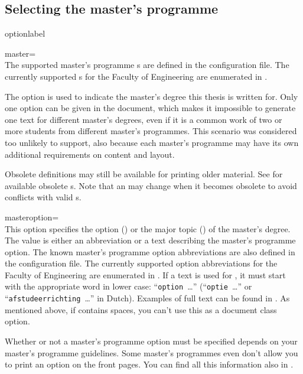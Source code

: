 \subsection{Selecting the master's programme}
\begin{labelled}{optionlabel}
\item[master=\meta{id\,}]\\
  The supported master's programme s are defined in the
  configuration file. The currently supported s for the Faculty of
  Engineering are enumerated in .

  The  option is used to indicate the master's degree this thesis
  is written for. Only one  option can be given in the document,
  which makes it impossible to generate one text for different master's
  degrees, even if it is a common work of two or more students from different
  master's programmes. This scenario was considered too unlikely to support,
  also because each master's programme may have its own additional requirements
  on content and layout.

  Obsolete  definitions may still be available for printing older
  material. See  for available obsolete s.
  Note that an  may change when it becomes obsolete to avoid
  conflicts with valid s.

\item[masteroption=\meta{mo}]\\
  This option specifies the option () or the major topic
  () of the master's degree. The value  is
  either an abbreviation or a text describing the master's programme option.
  The known master's programme option abbreviations are also defined in the
  configuration file. The currently supported option abbreviations for the
  Faculty of Engineering are enumerated in . If a text is
  used for , it must start with the appropriate word in lower case:
  ``\texttt{option }\ldots'' (``\texttt{\foreignlanguage{dutch}{optie}
  }\ldots'' or ``\texttt{\foreignlanguage{dutch}{afstudeerrichting} }\ldots''
  in Dutch). Examples of full text can be found in . As
  mentioned above, if  contains spaces, you can't use this as a
  document class option.

  Whether or not a master's programme option must be specified depends on your
  master's programme guidelines. Some master's programmes even don't allow you
  to print an option on the front pages. You can find all this information also
  in . %


\end{labelled}
